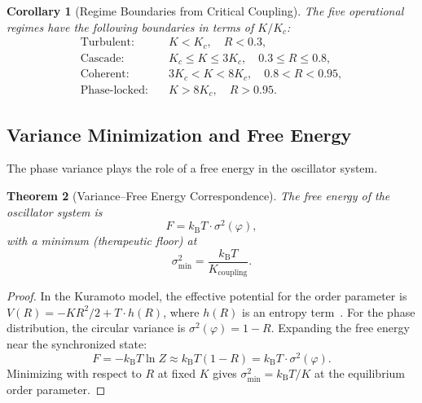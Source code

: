 \documentclass[aps,prd,twocolumn,superscriptaddress,floatfix,nofootinbib]{revtex4-2}
\newtheorem{theorem}{Theorem}[section]
\newtheorem{corollary}[theorem]{Corollary}
\theoremstyle{remark}
\newcommand{\kB}{k_{\mathrm{B}}}
\newcommand{\Rorder}{R}
\newcommand{\Kc}{K_c}
\begin{document}
\begin{corollary}[Regime Boundaries from Critical Coupling]
\label{cor:boundaries}
The five operational regimes have the following boundaries in terms of $K/\Kc$:
\begin{align}
    \text{Turbulent:} \quad & K < \Kc, \quad \Rorder < 0.3, \\
    \text{Cascade:} \quad & \Kc \leq K \leq 3\Kc, \quad 0.3 \leq \Rorder \leq 0.8, \\
    \text{Coherent:} \quad & 3\Kc < K < 8\Kc, \quad 0.8 < \Rorder < 0.95, \\
    \text{Phase-locked:} \quad & K > 8\Kc, \quad \Rorder > 0.95.
\end{align}
\end{corollary}

\subsection{Variance Minimization and Free Energy}

The phase variance plays the role of a free energy in the oscillator system.

\begin{theorem}[Variance--Free Energy Correspondence]
\label{thm:variance}
The free energy of the oscillator system is
\begin{equation}
    \boxed{F = \kB T \cdot \sigma^2(\varphi),}
    \label{eq:free_energy}
\end{equation}
with a minimum (therapeutic floor) at
\begin{equation}
    \sigma^2_{\min} = \frac{\kB T}{K_{\text{coupling}}}.
    \label{eq:variance_min}
\end{equation}
\end{theorem}

\begin{proof}
In the Kuramoto model, the effective potential for the order parameter is $V(\Rorder) = -K\Rorder^2/2 + T \cdot h(\Rorder)$, where $h(\Rorder)$ is an entropy term~\cite{acebron2005kuramoto}. For the phase distribution, the circular variance is $\sigma^2(\varphi) = 1 - \Rorder$. Expanding the free energy near the synchronized state:
\begin{equation}
    F = -\kB T \ln Z \approx \kB T (1 - \Rorder) = \kB T \cdot \sigma^2(\varphi).
\end{equation}
Minimizing with respect to $\Rorder$ at fixed $K$ gives $\sigma^2_{\min} = \kB T / K$ at the equilibrium order parameter.
\end{proof}
\end{document}
